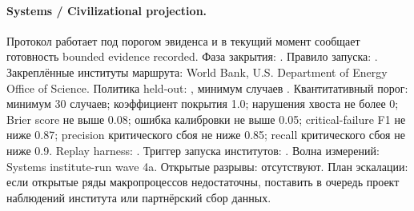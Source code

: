 \paragraph{Systems / Civilizational projection.}
Протокол  работает под порогом эвиденса  и в текущий момент сообщает готовность bounded evidence recorded.
Фаза закрытия: . Правило запуска: .
Закреплённые институты маршрута: World Bank, \allowbreak U.S. Department of Energy Office of Science.
Политика held-out: , минимум случаев .
Квантитативный порог: минимум 30 случаев; коэффициент покрытия 1.0; нарушения хвоста не более 0; Brier score не выше 0.08; ошибка калибровки не выше 0.05; critical-failure F1 не ниже 0.87; precision критического сбоя не ниже 0.85; recall критического сбоя не ниже 0.9.
Replay harness: .
Триггер запуска институтов: . Волна измерений: Systems institute-run wave 4a.
Открытые разрывы: отсутствуют.
План эскалации: если открытые ряды макропроцессов недостаточны, поставить в очередь проект наблюдений института или партнёрский сбор данных.
